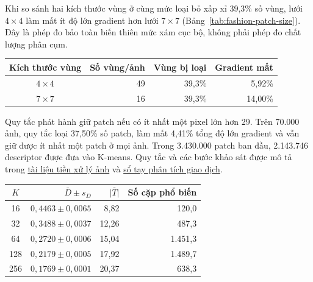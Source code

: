 \documentclass[conference,a4paper]{IEEEtran}
\makeatletter
\newenvironment{reporttable}{\par\medskip\noindent\begin{minipage}{\columnwidth}\def\@captype{table}\centering}{\end{minipage}\par\medskip}
\makeatother
\begin{document}
Khi so sánh hai kích thước vùng ở cùng mức loại bỏ xấp xỉ 39,3\%
số vùng, lưới $4\times4$ làm mất ít độ lớn gradient hơn lưới
$7\times7$ (Bảng~\ref{tab:fashion-patch-size}). Đây là phép đo
bảo toàn biến thiên mức xám cục bộ, không phải phép đo chất lượng
phân cụm.

\begin{reporttable}
\caption{So sánh kích thước vùng ảnh trong khảo sát tiền xử lý.}
\label{tab:fashion-patch-size}
\footnotesize
\begin{tabular}{crrr}\toprule
Kích thước vùng & Số vùng/ảnh & Vùng bị loại & Gradient mất \\
\midrule
$4\times4$ & 49 & 39,3\% & 5,92\% \\
$7\times7$ & 16 & 39,3\% & 14,00\% \\
\bottomrule
\end{tabular}
\end{reporttable}

Quy tắc phát hành giữ patch nếu có ít nhất một pixel lớn hơn 29.
Trên 70.000 ảnh, quy tắc loại 37,50\% số patch, làm mất 4,41\%
tổng độ lớn gradient và vẫn giữ được ít nhất một patch ở mọi ảnh.
Trong 3.430.000 patch ban đầu, 2.143.746 descriptor được đưa vào
K-means. Quy tắc và các bước khảo sát được mô tả trong
\href{https://github.com/NguyenVoTanDuy2006/DataMining-FIM-Project/blob/Fashion-Mnist/docs/UD2/TC_plan.md}{tài liệu tiền xử lý ảnh} và
\href{https://github.com/NguyenVoTanDuy2006/DataMining-FIM-Project/blob/Fashion-Mnist/notebooks/fashion-mnist/demo/03_transaction_exploration_and_mining.ipynb}{sổ tay phân tích giao dịch}.

\begin{reporttable}
\caption{Kết quả khảo sát K-means và giao dịch theo kích thước từ điển.}
\label{tab:fashion-k-selection}
\scriptsize
\setlength{\tabcolsep}{3pt}
\begin{tabular}{crrr}\toprule
$K$ & $\bar{D}\pm s_D$ & $\overline{|T|}$ & Số cặp phổ biến \\
\midrule
16  & $0{,}4463\pm0{,}0065$ & 8,82  & 120,0 \\
32  & $0{,}3488\pm0{,}0037$ & 12,26 & 487,3 \\
64  & $0{,}2720\pm0{,}0006$ & 15,04 & 1.451,3 \\
128 & $0{,}2179\pm0{,}0005$ & 17,92 & 1.489,7 \\
256 & $0{,}1769\pm0{,}0001$ & 20,37 & 638,3 \\
\bottomrule
\end{tabular}
\end{reporttable}
\end{document}
